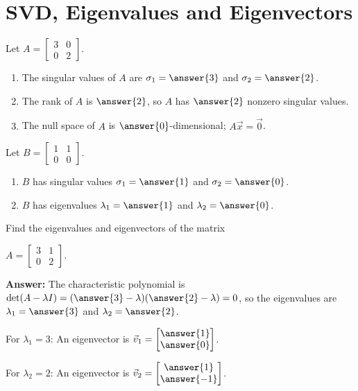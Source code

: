 \documentclass{ximera}
\begin{document}
\section*{SVD, Eigenvalues and Eigenvectors}

\begin{example}
    Let $A = \begin{bmatrix} 3 & 0 \\ 0 & 2 \end{bmatrix}$.
    \begin{enumerate}
        \item The singular values of $A$ are $\sigma_1 = \answer{3}$ and $\sigma_2 = \answer{2}$.

        \item The rank of $A$ is $\answer{2}$, so $A$ has $\answer{2}$ nonzero singular values.

        \item The null space of $A$ is $\answer{0}$-dimensional; $A\vec{x}=\vec{0}$.
    \end{enumerate}
\end{example}

\begin{example}
    Let $B = \begin{bmatrix} 1 & 1 \\ 0 & 0 \end{bmatrix}$.
    \begin{enumerate}
        \item $B$ has singular values $\sigma_1 = \answer{1}$ and $\sigma_2 = \answer{0}$.
        \item $B$ has eigenvalues $\lambda_1 = \answer{1}$ and $\lambda_2 = \answer{0}$.
    \end{enumerate}
\end{example}

\begin{example}
    Find the eigenvalues and eigenvectors of the matrix

    $A = \begin{bmatrix} 3 & 1 \\ 0 & 2 \end{bmatrix}$.

    \textbf{Answer:}
    The characteristic polynomial is $\det(A - \lambda I) = (\answer{3}-\lambda)(\answer{2}-\lambda) = 0$, so the eigenvalues are $\lambda_1 = \answer{3}$ and $\lambda_2 = \answer{2}$.

    For $\lambda_1 = 3$: An eigenvector is $\vec{v}_1 = \begin{bmatrix} \answer{1} \\ \answer{0} \end{bmatrix}$.

    For $\lambda_2 = 2$: An eigenvector is $\vec{v}_2 = \begin{bmatrix} \answer{1} \\ \answer{-1} \end{bmatrix}$.
\end{example}
\end{document}
